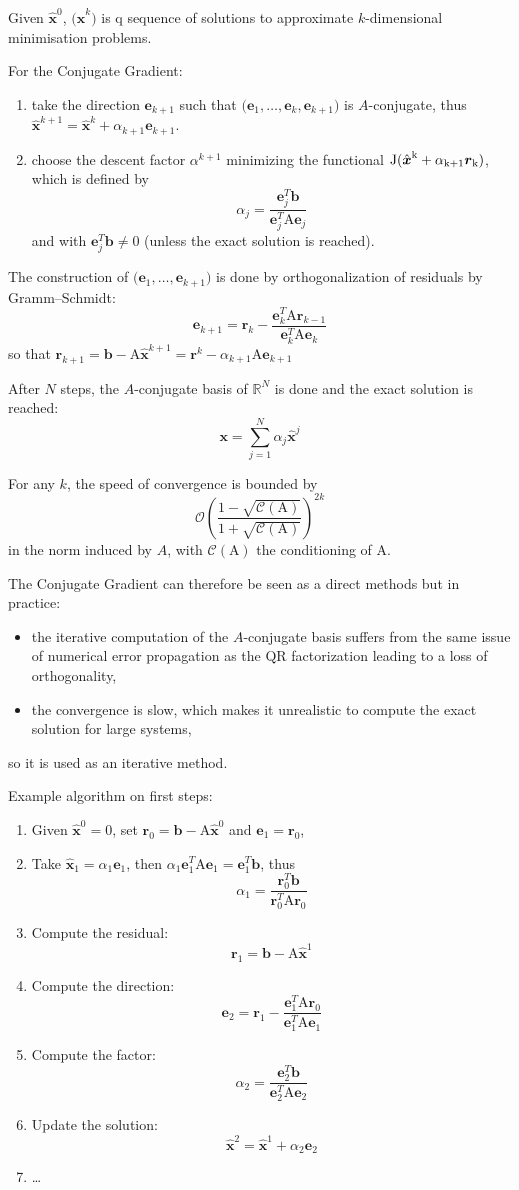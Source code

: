 \documentclass{article}
\newcommand{\xR}{\mathbb{R}}
\newcommand{\xRN}{{\xR^N}}
\newcommand{\bb}{{\boldsymbol b}}
\newcommand{\ee}{{\boldsymbol e}}
\newcommand{\rr}{{\boldsymbol r}}
\newcommand{\xx}{{\boldsymbol x}}
\newcommand{\hx}{\hat{\boldsymbol x}}
\newcommand{\mA}{{\mathrm A}}
\newcommand{\mR}{{\mathrm R}}
\newcommand{\mQ}{{\mathrm Q}}
\newcommand{\Seq}[1]{\bigl(#1\bigr)}
\newcommand{\Cond}[1]{\mathcal{C}(#1)}
\newcommand{\Order}[1]{\mathcal{O}\left(#1\right)}
\begin{document}
\medskip
Given $\hx^0$, $\Seq{\hx^k}$ is q sequence of solutions to approximate $k$-dimensional minimisation problems.

\medskip
For the Conjugate Gradient:
\begin{enumerate}
\item take the direction $\ee_{k+1}$ such that $\bigl(\ee_1, \dots, \ee_{k}, \ee_{k+1}\bigr)$ is $A$-conjugate, thus $\hx^{k+1} = \hx^{k} + \alpha_{k+1} \ee_{k+1}$.
\item choose the descent factor $\alpha^{k+1}$ minimizing the functional $\rm J(\hx^{k} + \alpha_{k+1} \rr_k)$, which is defined by
\[
\alpha_j = \frac{\ee^T_j\bb}{\ee^T_j\mA\ee_j}
\]
and with $\ee^T_j\bb \neq 0$ (unless the exact solution is reached).
\end{enumerate}

\medskip
The construction of $\bigl(\ee_1, \dots, \ee_{k+1}\bigr)$ is done by orthogonalization of residuals by Gramm--Schmidt:
\[
\ee_{k+1} = \rr_k - \frac{\ee^T_k\mA\rr_{k-1}}{\ee^T_k\mA\ee_k}
\]
so that $\rr_{k+1} = \bb - \mA\hx^{k+1} = \rr^k - \alpha_{k+1}\mA\ee_{k+1}$

\medskip
After $N$ steps, the $A$-conjugate basis of $\xRN$ is done and the exact solution is reached:
\[
 \xx = \sum_{j=1}^N \alpha_j \hx^j
\]

\medskip
For any $k$, the speed of convergence is bounded by
\[
\Order{ \frac{ 1-\sqrt{\Cond{\mA}} } { 1+\sqrt{\Cond{\mA}} } }^{2k}
\]
in the norm induced by $A$, with $\Cond{\mA}$ the conditioning of $\mA$.

\medskip
The Conjugate Gradient can therefore be seen as a direct methods but in practice:
\begin{itemize}
\item the iterative computation of the $A$-conjugate basis suffers from the same issue of numerical error propagation as the $\mQ\mR$ factorization leading to a loss of orthogonality,
\item the convergence is slow, which makes it unrealistic to compute the exact solution for large systems,
\end{itemize}
so it is used as an iterative method.

\medskip
Example algorithm on first steps:
\begin{enumerate}
\item Given $\hx^0 = 0$, set $\rr_0 = \bb - \mA \hx^0$ and $\ee_1 = \rr_0$,
\item Take $\hx_1 = \alpha_1 \ee_1$, then $\alpha_1\ee_1^T \mA \ee_1 = \ee_1^T \bb$, thus
\[
\alpha_1 = \frac{\rr^T_0\bb}{\rr^T_0\mA\rr_0}
\]
\item Compute the residual:
\[
\rr_1 = \bb - \mA \hx^1
\]
\item Compute the direction:
\[
\ee_{2} = \rr_1 - \frac{\ee^T_1\mA\rr_{0}}{\ee^T_1\mA\ee_1}
\]
\item Compute the factor:
\[
\alpha_2 = \frac{\ee^T_2\bb}{\ee^T_2\mA\ee_2}
\]
\item Update the solution:
\[
\hx^2 = \hx^1 + \alpha_2 \ee_2
\]
\item \dots
\end{enumerate}
\end{document}
